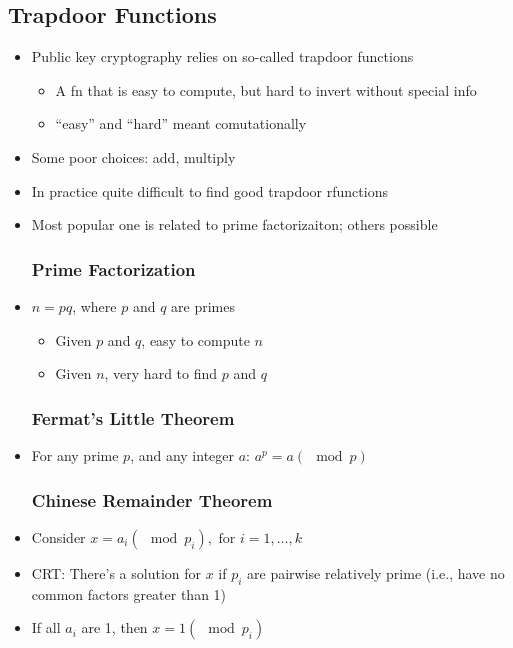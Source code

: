 \subsection{Trapdoor Functions}
\begin{itemize}
	\item Public key cryptography relies on so-called trapdoor functions
	\begin{itemize}
		\item A fn that is easy to compute, but hard to invert without special info
		\item ``easy'' and ``hard'' meant comutationally
	\end{itemize}
	\item Some poor choices: add, multiply
	\item In practice quite difficult to find good trapdoor rfunctions
	\item Most popular one is related to prime factorizaiton; others possible
	\subsubsection{Prime Factorization}
	\item $n=pq$, where $p$ and $q$ are primes
	\begin{itemize}
		\item Given $p$ and $q$, easy to compute $n$
		\item Given $n$, very hard to find $p$ and $q$
	\end{itemize}
	\subsubsection{Fermat's Little Theorem}
	\item For any prime $p$, and any integer $a$: $a^p = a(\mod p)$
	\subsubsection{Chinese Remainder Theorem}
	\item Consider $x = a_i (\mod p_i), \text{ for }i=1,\ldots, k$
	\item CRT: There's a solution for $x$ if $p_i$ are pairwise relatively prime (i.e., have no common factors greater than 1)
	\item If all $a_i$ are 1, then $x=1(\mod p_i)$
\end{itemize}

